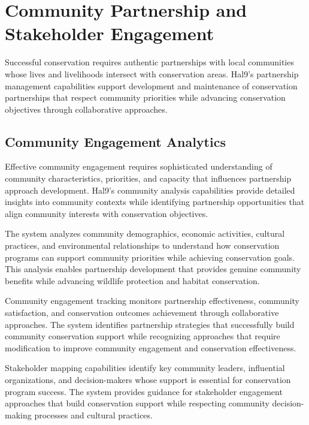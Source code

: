 \documentclass[
  Letterpaper,
]{scrbook}
\begin{document}
\section{Community Partnership and Stakeholder
Engagement}\label{community-partnership-and-stakeholder-engagement}

Successful conservation requires authentic partnerships with local
communities whose lives and livelihoods intersect with conservation
areas. Hal9's partnership management capabilities support development
and maintenance of conservation partnerships that respect community
priorities while advancing conservation objectives through collaborative
approaches.

\subsection{Community Engagement
Analytics}\label{community-engagement-analytics}

Effective community engagement requires sophisticated understanding of
community characteristics, priorities, and capacity that influences
partnership approach development. Hal9's community analysis capabilities
provide detailed insights into community contexts while identifying
partnership opportunities that align community interests with
conservation objectives.

The system analyzes community demographics, economic activities,
cultural practices, and environmental relationships to understand how
conservation programs can support community priorities while achieving
conservation goals. This analysis enables partnership development that
provides genuine community benefits while advancing wildlife protection
and habitat conservation.

Community engagement tracking monitors partnership effectiveness,
community satisfaction, and conservation outcomes achievement through
collaborative approaches. The system identifies partnership strategies
that successfully build community conservation support while recognizing
approaches that require modification to improve community engagement and
conservation effectiveness.

Stakeholder mapping capabilities identify key community leaders,
influential organizations, and decision-makers whose support is
essential for conservation program success. The system provides guidance
for stakeholder engagement approaches that build conservation support
while respecting community decision-making processes and cultural
practices.
\end{document}
